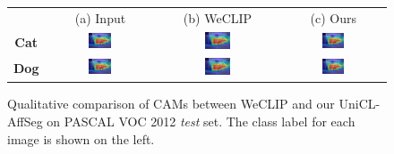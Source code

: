 \begin{figure}[ht]
  \centering
  \setlength{\tabcolsep}{2pt} %
  \renewcommand{\arraystretch}{0.9}

  \begin{tabular}{c c c c} %
    & (a) Input & (b) WeCLIP & (c) Ours \\[1mm]

    \textbf{Cat} &
    \includegraphics[width=0.23\textwidth]{figures/qualitative_analysis/test_cam/2010_005860_6.jpg} &
    \includegraphics[width=0.23\textwidth]{figures/qualitative_analysis/test_cam/2010_005860_6.jpg} &
    \includegraphics[width=0.23\textwidth]{figures/qualitative_analysis/test_cam/2010_005860_6.jpg} \\

    \textbf{Dog} &
    \includegraphics[width=0.23\textwidth]{figures/qualitative_analysis/test_cam/2010_005860_6.jpg} &
    \includegraphics[width=0.23\textwidth]{figures/qualitative_analysis/test_cam/2010_005860_6.jpg} &
    \includegraphics[width=0.23\textwidth]{figures/qualitative_analysis/test_cam/2010_005860_6.jpg} \\
  \end{tabular}

  \caption{Qualitative comparison of CAMs between WeCLIP and our UniCL-AffSeg on PASCAL VOC 2012 \textit{test} set. The class label for each image is shown on the left.}
  \label{fig:qualitative_comparison_cam_test}
\end{figure}

